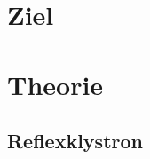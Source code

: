 \section*{Ziel}
    
\section{Theorie}
    \label{sec:theorie}
    \subsection{Reflexklystron}
    \label{sec:Reflexklystron}